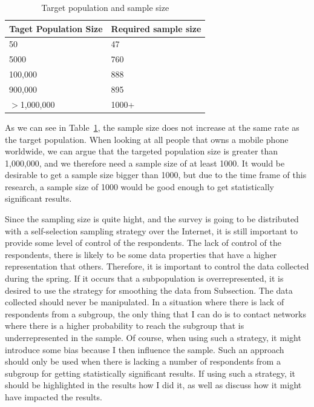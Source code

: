       \begin{table}[H]
        \begin{tabular}{| p{5cm} | p{5cm} |}
          \hline
          {\bf Taget Population Size} & {\bf Required sample size} \\ \hline
          50 & 47 \\
          5000 & 760 \\ 
          100,000 & 888 \\
          900,000 & 895 \\ 
          $>$1,000,000 & 1000+ \\ \hline
        \end{tabular}
        \caption{Target population and sample size \cite{empiriske}}
        \label{tab:sampleSize}
      \end{table}

    As we can see in Table~\ref{tab:sampleSize}, the sample size does not increase at the same rate as the target population. When looking at all people that owns a mobile phone worldwide, we can argue that the targeted population size is greater than 1,000,000, and we therefore need a sample size of at least 1000. It would be desirable to get a sample size bigger than 1000, but due to the time frame of this research, a sample size of 1000 would be good enough to get statistically significant results.

    Since the sampling size is quite hight, and the survey is going to be distributed with a self-selection sampling strategy over the Internet, it is still important to provide some level of control of the respondents. The lack of control of the respondents, there is likely to be some data properties that have a higher representation that others. Therefore, it is important to control the data collected during the spring. If it occurs that a subpopulation is overrepresented, it is desired to use the strategy for smoothing the data from Subsection. The data collected should never be manipulated. In a situation where there is lack of respondents from a subgroup, the only thing that I can do is to contact networks where there is a higher probability to reach the subgroup that is underrepresented in the sample. Of course, when using such a strategy, it might introduce some bias because I then influence the sample. Such an approach should only be used when there is lacking a number of respondents from a subgroup for getting statistically significant results. If using such a strategy, it should be highlighted in the results how I did it, as well as discuss how it might have impacted the results. 

